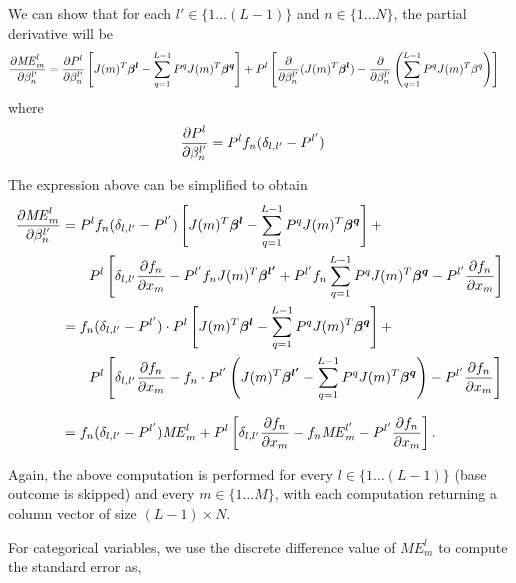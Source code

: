 We can show that for each $l' \in \{ 1 \ldots (L-1) \}$ and $n \in \{1 \ldots N\}$,
the partial derivative will be
\begin{align*}
  \pder[\mathit{ME}_m^l]{\beta_n^{l'}} &=
        \pder[P^l]{\beta_n^{l'}}
            \left[ J(m)^T \vec{\beta^l} -
                   \sum_{q=1}^{L-1} P^q J(m)^T \vec{\beta^q}
            \right] +
        P^l \left[ \pder[]{\beta_n^{l'}}(J(m)^T \vec{\beta^l}) -
                   \pder[]{\beta_n^{l'}} \left( \sum_{q=1}^{L-1} P^q J(m)^T \beta^q \right)
            \right]
\end{align*}
where
\begin{align*}
  \pder[P^l]{\beta_n^{l'}} &= P^l f_n (\delta_{l,l'} - P^{l'})
\end{align*}

The expression above can be simplified to obtain
\begin{align*}
  \pder[\mathit{ME}_m^l]{\beta_n^{l'}} &=
        P^l f_n (\delta_{l,l'} - P^{l'})
            \left[ J(m)^T \vec{\beta^l} -
                   \sum_{q=1}^{L-1} P^q J(m)^T \vec{\beta^q}
            \right] + \\
            & \qquad P^l \left[ \delta_{l,l'} \pder[f_n]{x_m} - P^{l'} f_n J(m)^T \vec{\beta^{l'}} +
                       P^{l'} f_n \sum_{q=1}^{L-1} P^q J(m)^T \vec{\beta^q} -
                       P^{l'} \pder[f_n]{x_m}
                \right] \\
        &= f_n (\delta_{l,l'} - P^{l'}) \cdot P^l \left[J(m)^T\vec{\beta^l} -
                   \sum_{q=1}^{L-1} P^q J(m)^T \vec{\beta^q} \right] + \\
            & \qquad  P^l \left[\delta_{l,l'} \pder[f_n]{x_m} -
                                f_n \cdot P^{l'}
                                \left( J(m)^T \vec{\beta^{l'}} - \sum_{q=1}^{L-1} P^q J(m)^T \vec{\beta^q} \right)
                                - P^{l'} \pder[f_n]{x_m}
                        \right] \\[7pt]
        &= f_n (\delta_{l, l'} - P^{l'})\mathit{ME}_m^l +
            P^l \left[ \delta_{l, l'} \pder[f_n]{x_m} - f_n \mathit{ME}_m^{l'} - P^{l'} \pder[f_n]{x_m} \right].
\end{align*}

Again, the above computation is performed for every $l \in \{1 \ldots (L-1)\}$ (base outcome is skipped)
and every $m \in \{1 \ldots M\}$, with each computation returning a column vector
of size $(L-1) \times N$.

For categorical variables, we use the discrete difference value of $\mathit{ME}_m^l$
to compute the standard error as,

